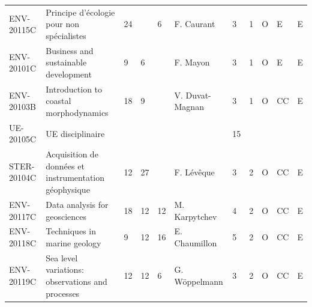 \documentclass[a4paper,11pt]{article}
\begin{document}
{{\begin{tabular}{lllllllllll}
ENV-20115C                         & Principe d'écologie pour non spécialistes                                                     & 24 &                            & 6  & F. Caurant                         & 3                         & 1    & O           & E                          & E                         \\
ENV-20101C                         & \cellcolor[HTML]{FD6864}Business and sustainable development                                  & 9  & 6                          &    & F. Mayon                           & 3                         & 1    & O           & E                          & E                         \\
ENV-20103B                         & \cellcolor[HTML]{FD6864}Introduction to coastal morphodynamics                                & 18 & 9                          &    & V. Duvat-Magnan                    & 3                         & 1    & O           & CC                         & E                         \\
\rowcolor[HTML]{EFEFEF} 
UE-20105C                          & UE disciplinaire                                                                              &    &                            &    &                                    & 15                        &      &             &                            &                           \\
\rowcolor[HTML]{BBDAFF} 
STER-20104C                        & Acquisition de données et instrumentation géophysique                                         & 12 & 27                         &    & F. Lévêque                         & 3                         & 2    & O           & CC                         & E                         \\
ENV-20117C                         & Data analysis for geosciences                                                                 & 18 & 12                         & 12 & M. Karpytchev                      & 4                         & 2    & O           & CC                         & E                         \\
ENV-20118C                         & Techniques in marine geology                                                                  & 9  & 12                         & 16 & E. Chaumillon                      & 5                         & 2    & O           & \cellcolor[HTML]{FD6864}CC & E                         \\
ENV-20119C                         & Sea level variations: observations and processes                                              & 12 & 12                         & 6  & G. Wöppelmann                      & 3                         & 2    & O           & CC                         & E                         \\

\end{tabular}}}
\end{document}
